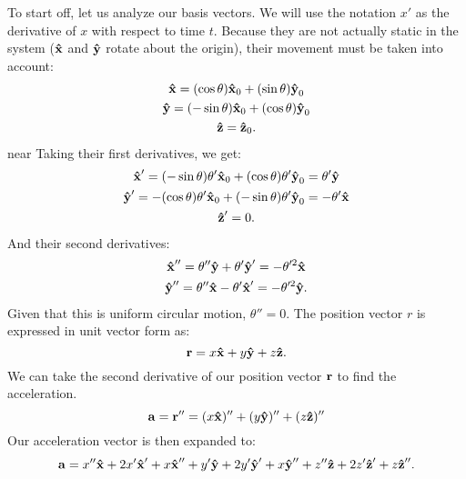 To start off, let us analyze our basis vectors.
We will use the notation $x'$ as the derivative of $x$ with respect to time $t$.
Because they are not actually static in the system ($\uvec{x}$ and $\uvec{y}$ rotate about the origin), their movement must be taken into account:
\begin{gather*}
	\uvec{x} = (\cos\theta)\uvec{x}_0 + (\sin\theta)\uvec{y}_0 \\
	\uvec{y} = (-\sin\theta)\uvec{x}_0 + (\cos\theta)\uvec{y}_0 \\
	\uvec{z} = \uvec{z}_0 \text{.}
\end{gather*}near
Taking their first derivatives, we get:
\begin{gather*}
	\uvec{x}' = (-\sin\theta)\theta'\uvec{x}_0 + (\cos\theta)\theta'\uvec{y}_0 = \theta'\uvec{y} \\
	\uvec{y}' = -(\cos\theta)\theta'\uvec{x}_0 + (-\sin\theta)\theta'\uvec{y}_0 = -\theta'\uvec{x} \\
	\uvec{z}' = 0 \text{.}
\end{gather*}
And their second derivatives:
\begin{gather*}
	\uvec{x}'' = \theta''\uvec{y} + \theta'\uvec{y}' =  - \theta'^2\uvec{x} \\
	\uvec{y}'' = \theta''\uvec{x} - \theta'\uvec{x}' =  - \theta'^2\uvec{y} \text{.}
\end{gather*}
Given that this is uniform circular motion, $\theta'' = 0$.
The position vector $r$ is expressed in unit vector form as:
\begin{equation*}
	\bvec{r} = x\uvec{x} + y\uvec{y} + z\uvec{z} \text{.}
\end{equation*}
We can take the second derivative of our position vector $\bm{\mathbf{r}}$ to find the acceleration.
\begin{equation*}
	\bvec{a} = \bvec{r}'' = (x\uvec{x})'' + (y\uvec{y})'' + (z\uvec{z})''
\end{equation*}
Our acceleration vector is then expanded to:
\begin{equation*}
	\bvec{a} = x''\uvec{x} + 2x'\uvec{x}' + x\uvec{x}'' + y'\uvec{y} + 2y'\uvec{y}' + x\uvec{y}'' + z''\uvec{z} + 2z'\uvec{z}' + z\uvec{z}'' \text{.}
\end{equation*}

